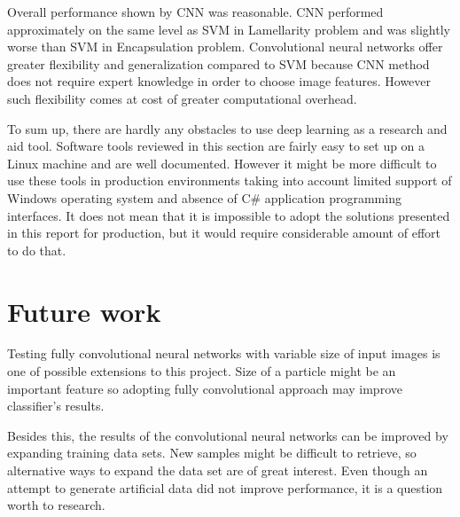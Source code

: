\documentclass[a4paper, 11pt, table]{article}
\begin{document}
Overall performance shown by CNN was reasonable. CNN performed approximately on the same level as SVM in Lamellarity problem and was slightly worse than SVM in Encapsulation problem. Convolutional neural networks offer greater flexibility and generalization compared to SVM because CNN method does not require expert knowledge in order to choose image features. However such flexibility comes at cost of greater computational overhead.

To sum up, there are hardly any obstacles to use deep learning as a
research and aid tool. Software tools reviewed in this section are fairly easy
to set up on a Linux machine and are well documented. However it might
be more difficult to use these tools in production environments taking into
account limited support of Windows operating system and absence of C\#
application programming interfaces. It does not mean that it is impossible to
adopt the solutions presented in this report for production, but it would require
considerable amount of effort to do that.

\section{Future work}
Testing fully convolutional neural networks with variable size of input images is one of possible extensions to this project. Size of a particle might be an important feature so adopting fully convolutional approach may improve classifier's results.

Besides this, the results of the convolutional neural networks can be improved by expanding training data sets. New samples might be difficult to retrieve, so alternative ways to expand the data set are of great interest. Even though an attempt to generate artificial data did not improve performance, it is a question worth to research.

\newpage
\printbibliography
\end{document}
